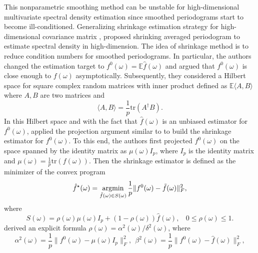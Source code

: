 \par
This nonparametric smoothing method can be unstable for high-dimensional multivariate spectral density estimation since smoothed periodograms start to become ill-conditioned. Generalizing shrinkage estimation strategy for high-dimensional covariance matrix \citep{ledoit2004well}, \citet{bohm2009shrinkage} proposed shrinking averaged periodogram to estimate spectral density in high-dimension. The idea of shrinkage method is to reduce condition numbers for smoothed periodograms. In particular, the authors changed the estimation target to $f^0(\omega) = \mathbb{E} \hat{f}(\omega)$ and argued that $f^0(\omega)$ is close enough to $f(\omega)$ asymptotically. Subsequently, they considered a Hilbert space for square complex random matrices with inner product defined as  $\mathbb{E}\langle A,B\rangle$ where $A,B$ are two  matrices and 
\begin{equation}
\langle A,B \rangle = \frac{1}{p} \text{tr}(A^\dag B).\nonumber %
\end{equation} 
In this Hilbert space and with the fact that $\hat{f}(\omega)$ is an unbiased estimator for $f^0(\omega)$,  \citet{bohm2009shrinkage} applied the projection argument similar to \citet{ledoit2004well} to build the shrinkage estimator for $f^0(\omega)$. To this end, the authors first projected $f^0(\omega)$ on the space spanned by the identity matrix as $\mu(\omega) I_p$, where $I_p$ is the identity matrix and $ \mu(\omega)= \frac{1}{p} \text{tr}(f(\omega))$. Then the shrinkage estimator is defined as the minimizer of the convex program 
\begin{equation}
\hat{f}^\star(\omega) = \argmin_{\tilde{f}(\omega) \in S(\omega)} \frac 1 p \|f^0(\omega) - \tilde{f}(\omega)\|^2_F, \nonumber
\end{equation}
where 
\begin{equation}
S(\omega) = \rho(\omega) \mu(\omega)I_p + (1-\rho(\omega)) \hat{f}(\omega), ~~~~ 0\le \rho(\omega)\le 1. \nonumber
\end{equation}
\citet{bohm2009shrinkage} derived an explicit formula 
$\rho(\omega) = {\alpha^2(\omega)}/{\delta^2(\omega)}$,
where 
\begin{equation*}
    \alpha^2(\omega) = \frac 1 p \|f^0(\omega) - \mu(\omega)I_p\|^2_F,~~
    \beta^2(\omega) = \frac 1 p \|f^0(\omega)-\hat{f}(\omega)\|^2_F,
\end{equation*}
